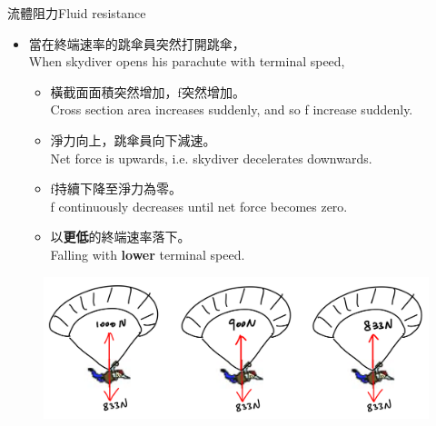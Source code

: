 \documentclass[beamer=true]{standalone}
\begin{document}
\begin{frame}{流體阻力Fluid resistance}
    \begin{itemize}
        \item 當在終端速率的跳傘員突然打開跳傘，\\When skydiver opens his parachute with terminal speed,
              \begin{itemize}
                  \item 橫截面面積突然增加，f突然增加。\\Cross section area increases suddenly, and so f increase suddenly.
                  \item 淨力向上，跳傘員向下減速。\\Net force is upwards, i.e. skydiver decelerates downwards.
                  \item f持續下降至淨力為零。\\f continuously decreases until net force becomes zero.
                  \item 以\textbf{更低}的終端速率落下。\\Falling with \textbf{lower} terminal speed.
              \end{itemize}
    \end{itemize}

    \begin{figure}[h!]
        \centering
        \includegraphics[width=.55\textwidth]{assets/bacb418f.png}
    \end{figure}

\end{frame}
\end{document}

